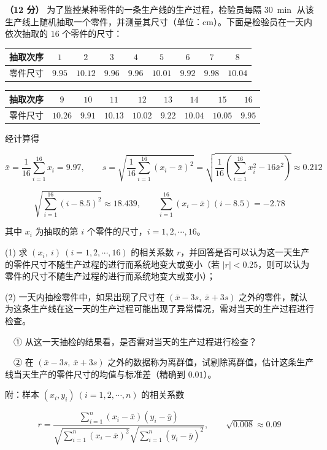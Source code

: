 \begin{question}
\textbf{（12 分）} 为了监控某种零件的一条生产线的生产过程，检验员每隔 $30\ \min$ 从该生产线上随机抽取一个零件，并测量其尺寸（单位：$\mathrm{cm}$）。下面是检验员在一天内依次抽取的 $16$ 个零件的尺寸：

\begin{center}
\begingroup\setlength{\tabcolsep}{4pt}
\begin{tabular}{ccccccccc}
\toprule
抽取次序 & $1$ & $2$ & $3$ & $4$ & $5$ & $6$ & $7$ & $8$ \\
\midrule
零件尺寸 & $9.95$ & $10.12$ & $9.96$ & $9.96$ & $10.01$ & $9.92$ & $9.98$ & $10.04$ \\
\bottomrule
\end{tabular}
\endgroup
\end{center}

\begin{center}
\begingroup\setlength{\tabcolsep}{4pt}
\begin{tabular}{ccccccccc}
\toprule
抽取次序 & $9$ & $10$ & $11$ & $12$ & $13$ & $14$ & $15$ & $16$ \\
\midrule
零件尺寸 & $10.26$ & $9.91$ & $10.13$ & $10.02$ & $9.22$ & $10.04$ & $10.05$ & $9.95$ \\
\bottomrule
\end{tabular}
\endgroup
\end{center}

经计算得

\nopagebreak[4]
\[\bar x=\frac1{16}\sum_{i=1}^{16}x_i=9.97,\qquad s=\sqrt{\frac1{16}\sum_{i=1}^{16}\left(x_i-\bar x\right)^{2}}=\sqrt{\frac1{16}\left(\sum_{i=1}^{16}x_i^{2}-16\bar x^{2}\right)}\approx0.212\]

\nopagebreak[4]
\[\sqrt{\sum_{i=1}^{16}(i-8.5)^{2}}\approx18.439,\qquad \sum_{i=1}^{16}\left(x_i-\bar x\right)(i-8.5)=-2.78\]

其中 $x_i$ 为抽取的第 $i$ 个零件的尺寸，$i=1,2,\cdots,16$。

  (1) 求 $\left(x_i,\ i\right)\ (i=1,2,\cdots,16)$ 的相关系数 $r$，并回答是否可以认为这一天生产的零件尺寸不随生产过程的进行而系统地变大或变小（若 $|r|<0.25$，则可以认为零件的尺寸不随生产过程的进行而系统地变大或变小）；

  (2) 一天内抽检零件中，如果出现了尺寸在 $(\bar x-3s,\ \bar x+3s)$ 之外的零件，就认为这条生产线在这一天的生产过程可能出现了异常情况，需对当天的生产过程进行检查。

  　① 从这一天抽检的结果看，是否需对当天的生产过程进行检查？

  　② 在 $(\bar x-3s,\ \bar x+3s)$ 之外的数据称为离群值，试剔除离群值，估计这条生产线当天生产的零件尺寸的均值与标准差（精确到 $0.01$）。

  附：样本 $\left(x_i,y_i\right)\ (i=1,2,\cdots,n)$ 的相关系数

\nopagebreak[4]
\[r=\frac{\sum\limits_{i=1}^{n}\left(x_i-\bar x\right)\left(y_i-\bar y\right)}{\sqrt{\sum\limits_{i=1}^{n}\left(x_i-\bar x\right)^{2}}\sqrt{\sum\limits_{i=1}^{n}\left(y_i-\bar y\right)^{2}}},\qquad \sqrt{0.008}\approx0.09\]

\end{question}
